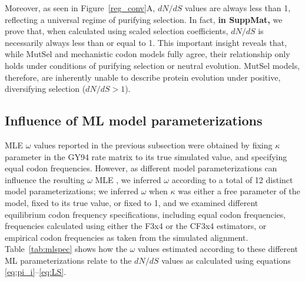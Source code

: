 \documentclass[11pt]{article}
\begin{document}
Moreover, as seen in Figure~\ref{reg_conv}A, $dN/dS$ values are always less than 1, reflecting a universal regime of purifying selection. In fact, \textbf{in SuppMat,} we prove that, when calculated using scaled selection coefficients, $dN/dS$ is necessarily always less than or equal to 1. This important insight reveals that, while MutSel and mechanistic codon models fully agree, their relationship only holds under conditions of purifying selection or neutral evolution. MutSel models, therefore, are inherently unable to describe protein evolution under positive, diversifying selection ($dN/dS > 1$).



\subsection*{Influence of ML model parameterizations}

MLE $\omega$ values reported in the previous subsection were obtained by fixing $\kappa$ parameter in the GY94 rate matrix to its true simulated value, and specifying equal codon frequencies. However, as different model parameterizations can influence the resulting $\omega$ MLE \cite{YN00,Yang2006,ZhangYu2006}, we inferred $\omega$ according to a total of 12 distinct model parameterizations; we inferred $\omega$ when $\kappa$ was either a free parameter of the model, fixed to its true value, or fixed to 1, and we examined different equilibrium codon frequency specifications, including equal codon frequencies, frequencies calculated using either the F3x4 \cite{MuseGaut1994} or the CF3x4 \cite{Pond2010} estimators, or empirical codon frequencies as taken from the simulated alignment. Table~\ref{tab:mlspec} shows how the $\omega$ values estimated according to these different ML parameterizations relate to the $dN/dS$ values as calculated using equations \eqref{eq:pi_i}--\eqref{eq:LS}. 
\end{document}
